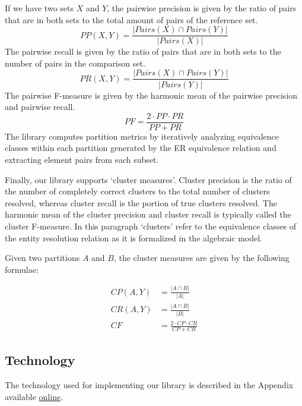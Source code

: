 \documentclass[a4paper,twoside]{article}
\newcommand{\appendixurl}{https://matchescu.github.io/py-resolve-metrics/article/02_appendix.pdf}
\begin{document}
    If we have two sets $X$ and $Y$, the pairwise precision is given by the
    ratio of pairs that are in both sets to the total amount of pairs of the
    reference set.
    \begin{equation}
        PP(X, Y) = \frac{|{Pairs(X)}\cap{Pairs(Y)}|}{|Pairs(X)|}
    \end{equation}    
    The pairwise recall is given by the ratio of pairs that are in both sets
    to the number of pairs in the comparison set\cite{hitesh2012}.
    \begin{equation}
        PR(X, Y) = \frac{|{Pairs(X)}\cap{Pairs(Y)}|}{|Pairs(Y)|}
    \end{equation}
    The pairwise F-measure is given by the harmonic mean of the pairwise
    precision and pairwise recall.
    \begin{equation}
        PF = \frac{2 \cdot PP \cdot PR}{PP + PR}
    \end{equation}
    The library computes partition metrics by iteratively analyzing equivalence
    classes within each partition generated by the ER equivalence relation and
    extracting element pairs from each subset.
    
    Finally, our library supports `cluster measures'\cite{hitesh2012}.
    Cluster precision is the ratio of the number of completely correct
    clusters to the total number of clusters resolved, whereas cluster recall
    is the portion of true clusters resolved\cite{huang2006efficient}.
    The harmonic mean of the cluster precision and cluster recall is typically
    called the cluster F-measure.
    In this paragraph `clusters' refer to the equivalence classes of the entity
    resolution relation as it is formalized in the algebraic model.
    
    Given two partitions $A$ and $B$, the cluster measures are given by the
    following formulae:

    \begin{align}
        CP(A, Y) &= \frac{|{A}\cap{B}|}{|A|}\\
        CR(A, Y) &= \frac{|{A}\cap{B}|}{|B|}\\
        CF &= \frac{2\cdot{CP}\cdot{CR}}{CP + CR}
    \end{align}

    \subsection{Technology}\label{sec:tech}

    The technology used for implementing our library is described in
    the Appendix~\cite{appendix2024} available \href{\appendixurl}{online}.
    
\end{document}
